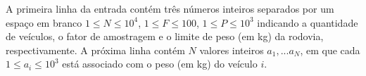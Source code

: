 A primeira linha da entrada contém três números inteiros separados por um espaço em branco $1 \leq N \leq 10^4$, $1 \leq F \leq 100$, $1 \leq P \leq 10^3$ indicando a quantidade de veículos, o fator de amostragem e o limite de peso (em kg) da rodovia, respectivamente. A próxima linha contém $N$ valores inteiros $a_1,...a_N$, em que cada $1 \leq a_i \leq 10^3$ está associado com o peso (em kg) do veículo $i$. 
